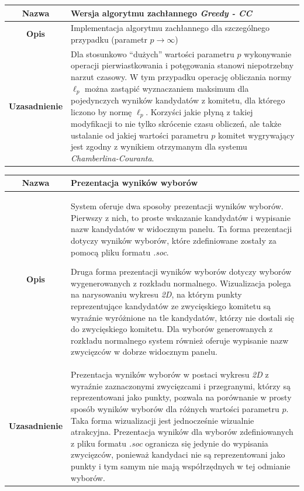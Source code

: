 \documentclass[polish,11pt]{aghthesis}
\begin{document}
{
\centering
\begin{tabular}{|c|p{10cm}|}
\hline
\textbf{Nazwa} & Wersja algorytmu zachłannego \textit{Greedy - CC} \\ 
\hline 
\textbf{Opis} & Implementacja algorytmu zachłannego dla szczególnego przypadku
(parametr $p \to \infty$) \\ 
\hline 
\textbf{Uzasadnienie} & Dla stosunkowo ``dużych'' wartości parametru $p$ wykonywanie operacji
pierwiastkowania i potęgowania stanowi niepotrzebny narzut czasowy.
W tym przypadku operację obliczania normy $\ell_p$ można zastąpić
wyznaczaniem maksimum dla pojedynczych wyników kandydatów z
komitetu, dla którego liczono by normę $\ell_p$.
Korzyści jakie płyną z takiej modyfikacji to nie tylko skrócenie czasu
obliczeń, ale także ustalanie od jakiej wartości parametru $p$ komitet
wygrywający jest zgodny z wynikiem otrzymanym dla systemu
\textit{Chamberlina-Couranta}.\\ 
\hline 
\end{tabular} 
}
\vspace{\baselineskip}
{
\centering
\begin{tabular}{|c|p{10cm}|}
\hline
\textbf{Nazwa} & Prezentacja wyników wyborów \\ 
\hline 
\textbf{Opis} & System oferuje dwa sposoby prezentacji wyników wyborów. Pierwszy z
nich, to proste wskazanie kandydatów i wypisanie nazw kandydatów w
widocznym panelu. Ta forma prezentacji dotyczy wyników wyborów,
które zdefiniowane zostały za pomocą pliku formatu \textit{.soc}.

Druga forma prezentacji wyników wyborów dotyczy wyborów wygenerowanych z
rozkładu normalnego. Wizualizacja polega na narysowaniu wykresu
\textit{2D}, na którym punkty reprezentujące kandydatów ze zwycięskiego
komitetu są wyraźnie wyróżnione na tle kandydatów, którzy nie dostali
się do zwycięskiego komitetu. Dla wyborów generowanych z rozkładu normalnego system również oferuje wypisanie nazw zwycięzców w dobrze widocznym panelu.\\ 
\hline 
\textbf{Uzasadnienie} & Prezentacja wyników wyborów w postaci wykresu \textit{2D} z wyraźnie
zaznaczonymi zwycięzcami i przegranymi, którzy są reprezentowani
jako punkty, pozwala na porównanie w prosty sposób wyników
wyborów dla różnych wartości parametru $p$. Taka forma wizualizacji
jest jednocześnie wizualnie atrakcyjna.
Prezentacja wyników dla wyborów zdefiniowanych z pliku formatu \textit{.soc}
ogranicza się jedynie do wypisania zwycięzców, ponieważ kandydaci
nie są reprezentowani jako punkty i tym samym nie mają
współrzędnych w tej odmianie wyborów.\\ 
\hline 
\end{tabular} 
}
\end{document}
